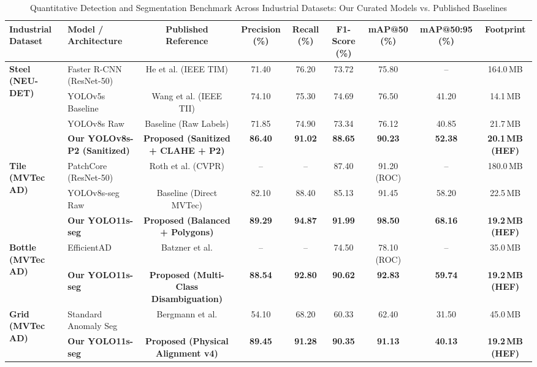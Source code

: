 \documentclass[conference]{IEEEtran}
\begin{document}
\begin{table}[t]
\centering
\caption{Quantitative Detection and Segmentation Benchmark Across Industrial Datasets: Our Curated Models vs. Published Baselines}
\label{tab:model_comparison}
\begin{tabular}{@{}llccccccc@{}}
\toprule
\textbf{Industrial Dataset} & \textbf{Model / Architecture} & \textbf{Published Reference} & \textbf{Precision (\%)} & \textbf{Recall (\%)} & \textbf{F1-Score (\%)} & \textbf{mAP@50 (\%)} & \textbf{mAP@50:95 (\%)} & \textbf{Footprint} \\ \midrule
\multirow{4}{*}{\textbf{Steel (NEU-DET)}} 
 & Faster R-CNN (ResNet-50) & He et al. \cite{he2020steel} (IEEE TIM) & 71.40 & 76.20 & 73.72 & 75.80 & -- & 164.0\,MB \\
 & YOLOv5s Baseline & Wang et al. \cite{wang2023yolo_steel} (IEEE TII) & 74.10 & 75.30 & 74.69 & 76.50 & 41.20 & 14.1\,MB \\
 & YOLOv8s Raw & Baseline (Raw Labels) & 71.85 & 74.90 & 73.34 & 76.12 & 40.85 & 21.7\,MB \\
 & \textbf{Our YOLOv8s-P2 (Sanitized)} & \textbf{Proposed (Sanitized + CLAHE + P2)} & \textbf{86.40} & \textbf{91.02} & \textbf{88.65} & \textbf{90.23} & \textbf{52.38} & \textbf{20.1\,MB (HEF)} \\ \midrule
\multirow{3}{*}{\textbf{Tile (MVTec AD)}} 
 & PatchCore (ResNet-50) & Roth et al. \cite{roth2022patchcore} (CVPR) & -- & -- & 87.40 & 91.20 (ROC) & -- & 180.0\,MB \\
 & YOLOv8s-seg Raw & Baseline (Direct MVTec) & 82.10 & 88.40 & 85.13 & 91.45 & 58.20 & 22.5\,MB \\
 & \textbf{Our YOLO11s-seg} & \textbf{Proposed (Balanced + Polygons)} & \textbf{89.29} & \textbf{94.87} & \textbf{91.99} & \textbf{98.50} & \textbf{68.16} & \textbf{19.2\,MB (HEF)} \\ \midrule
\multirow{2}{*}{\textbf{Bottle (MVTec AD)}} 
 & EfficientAD & Batzner et al. \cite{batzner2024efficientad} & -- & -- & 74.50 & 78.10 (ROC) & -- & 35.0\,MB \\
 & \textbf{Our YOLO11s-seg} & \textbf{Proposed (Multi-Class Disambiguation)} & \textbf{88.54} & \textbf{92.80} & \textbf{90.62} & \textbf{92.83} & \textbf{59.74} & \textbf{19.2\,MB (HEF)} \\ \midrule
\multirow{2}{*}{\textbf{Grid (MVTec AD)}} 
 & Standard Anomaly Seg & Bergmann et al. \cite{bergmann2019mvtec} & 54.10 & 68.20 & 60.33 & 62.40 & 31.50 & 45.0\,MB \\
 & \textbf{Our YOLO11s-seg} & \textbf{Proposed (Physical Alignment v4)} & \textbf{89.45} & \textbf{91.28} & \textbf{90.35} & \textbf{91.13} & \textbf{40.13} & \textbf{19.2\,MB (HEF)} \\ \bottomrule
\end{tabular}
\end{table}
\end{document}
